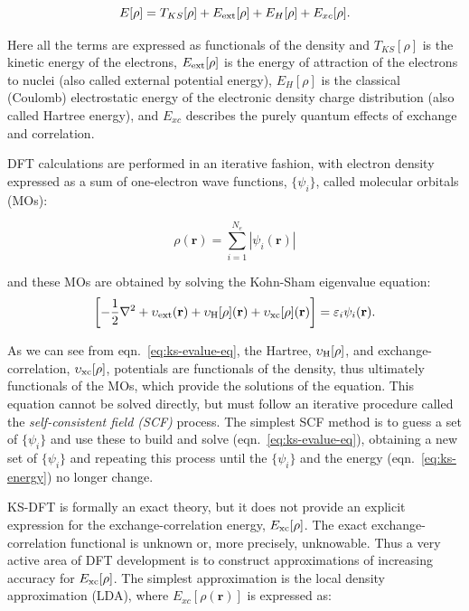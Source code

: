 \documentclass[../main.tex]{subfiles}
\begin{document}
\begin{equation}
    \label{eq:ks-energy}
    E[\rho] = T_{KS}[\rho] + E_{\rm ext}[\rho] + E_{H}[\rho] + E_{xc}[\rho].
\end{equation}

Here all the terms are expressed as functionals of the density and $T_{KS}[\rho]$ is the kinetic energy of the electrons, $ E_{\rm ext}[\rho]$ is the energy of attraction of the electrons to nuclei (also called external potential energy), $E_{H}[\rho]$ is the classical (Coulomb) electrostatic energy of the electronic density charge distribution (also called Hartree energy), and $E_{xc}$ describes the purely quantum effects of exchange and correlation. 

DFT calculations are performed in an iterative fashion, with electron density expressed as a sum of one-electron wave functions, $\{ \psi_i \}$, called molecular orbitals (MOs):

\begin{equation}
    \rho(\mathbf{r}) = \sum_{i=1}^{N_e} | \psi_i(\mathbf{r})|
\end{equation}

and these MOs are obtained by solving the Kohn-Sham eigenvalue equation:
\begin{equation}
   \left [ -\frac{1}{2}\nabla^2 + \upsilon_{\rm ext}(\mathbf{r}) 
    + \upsilon_{\rm H}[\rho](\mathbf{r}) 
    + \upsilon_{\rm xc}[\rho](\mathbf{r}) \right ]
    = \varepsilon_i \psi_i(\mathbf{r}).
    \label{eq:ks-evalue-eq}
\end{equation}

As we can see from eqn.~\ref{eq:ks-evalue-eq}, the Hartree, $\upsilon_{\rm H}[\rho]$, and exchange-correlation, $\upsilon_{\rm xc}[\rho]$, potentials are functionals of the density, thus ultimately functionals of the MOs, which provide the solutions of the equation. This equation cannot be solved directly, but must follow an iterative procedure called the \emph{self-consistent field (SCF)} process. The simplest SCF method is to guess a set of $\{ \psi_i \}$ and use these to build and solve (eqn.~\ref{eq:ks-evalue-eq}), obtaining a new set of $\{ \psi_i \}$ and repeating this process until the $\{ \psi_i \}$ and the energy (eqn.~\ref{eq:ks-energy}) no longer change.

KS-DFT is formally an exact theory, but it does not provide an explicit expression for the exchange-correlation energy, $E_{\rm xc}[\rho]$. The exact exchange-correlation functional is unknown or, more precisely, unknowable. Thus a very active area of DFT development is to construct approximations of increasing accuracy for $E_{\rm xc}[\rho]$. The simplest approximation is the local density approximation (LDA), where $E_{xc}[\rho(\mathbf{r})]$ is expressed as:
\end{document}
